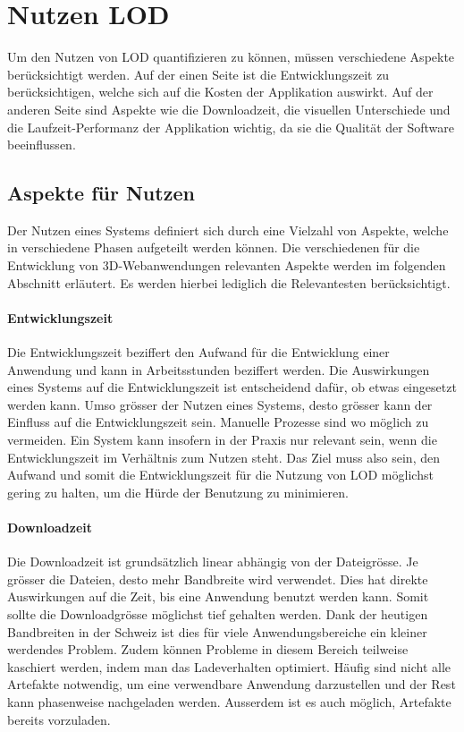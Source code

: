 \section{Nutzen LOD}
Um den Nutzen von LOD quantifizieren zu können, müssen verschiedene Aspekte berücksichtigt werden. Auf der einen Seite ist die Entwicklungszeit zu berücksichtigen, welche sich auf die Kosten der Applikation auswirkt. Auf der anderen Seite sind Aspekte wie die Downloadzeit, die visuellen Unterschiede und die Laufzeit-Performanz der Applikation wichtig, da sie die Qualität der Software beeinflussen.

\subsection{Aspekte für Nutzen}

Der Nutzen eines Systems definiert sich durch eine Vielzahl von Aspekte, welche in verschiedene Phasen aufgeteilt werden können. Die verschiedenen für die Entwicklung von 3D-Webanwendungen relevanten Aspekte werden im folgenden Abschnitt erläutert. Es werden hierbei lediglich die Relevantesten berücksichtigt.

\paragraph{Entwicklungszeit}

Die Entwicklungszeit beziffert den Aufwand für die Entwicklung einer Anwendung und kann in Arbeitsstunden beziffert werden.
Die Auswirkungen eines Systems auf die Entwicklungszeit ist entscheidend dafür, ob etwas eingesetzt werden kann. Umso grösser der Nutzen eines Systems, desto grösser kann der Einfluss auf die Entwicklungszeit sein. Manuelle Prozesse sind wo möglich zu vermeiden. Ein System kann insofern in der Praxis nur relevant sein, wenn die Entwicklungszeit im Verhältnis zum Nutzen steht. Das Ziel muss also sein, den Aufwand und somit die Entwicklungszeit für die Nutzung von LOD möglichst gering zu halten, um die Hürde der Benutzung zu minimieren.

\paragraph{Downloadzeit}

Die Downloadzeit ist grundsätzlich linear abhängig von der Dateigrösse.
Je grösser die Dateien, desto mehr Bandbreite wird verwendet. Dies hat direkte Auswirkungen auf die Zeit, bis eine Anwendung benutzt werden kann. Somit sollte die Downloadgrösse möglichst tief gehalten werden.
Dank der heutigen Bandbreiten in der Schweiz ist dies für viele Anwendungsbereiche ein kleiner werdendes Problem. 
Zudem können Probleme in diesem Bereich teilweise kaschiert werden, indem man das Ladeverhalten optimiert. Häufig sind nicht alle Artefakte notwendig, um eine verwendbare Anwendung darzustellen und der Rest kann phasenweise nachgeladen werden.
Ausserdem ist es auch möglich, Artefakte bereits vorzuladen.

